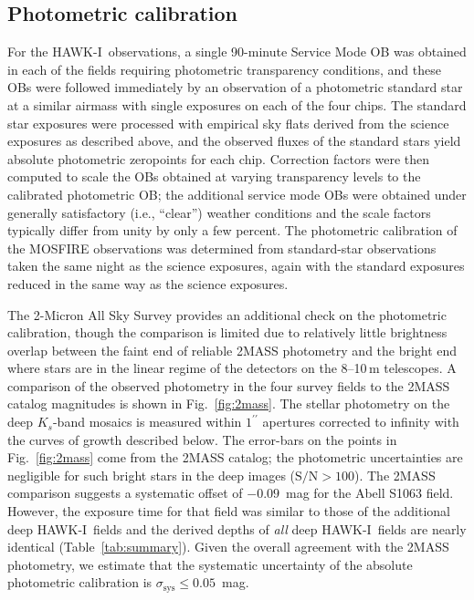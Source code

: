 \documentclass[preprint2]{aastex6}
\gdef\arcsec{^{\prime\prime}}
\gdef\HAWKI{\mbox{HAWK-I}}
\begin{document}
\subsection{Photometric calibration}
\label{s:calib}

For the \HAWKI\ observations, a single 90-minute Service Mode OB was obtained in each of the fields requiring photometric transparency conditions, and these OBs were followed immediately by an observation of a photometric standard star at a similar airmass with single exposures on each of the four chips.  The standard star exposures were processed with empirical sky flats derived from the science exposures as described above, and the observed fluxes of the standard stars yield absolute photometric zeropoints for each chip.  Correction factors were then computed to scale the OBs obtained at varying transparency levels to the calibrated photometric OB; the additional service mode OBs were obtained under generally satisfactory (i.e., ``clear'') weather conditions and the scale factors typically differ from unity by only a few percent.  The photometric calibration of the MOSFIRE observations was determined from standard-star observations taken the same night as the science exposures, again with the standard exposures reduced in the same way as the science exposures.

The 2-Micron All Sky Survey \citep[2MASS;][]{2mass} provides an additional check on the photometric calibration, though the comparison is limited due to relatively little brightness overlap between the faint end of reliable 2MASS photometry and the bright end where stars are in the linear regime of the detectors on the 8--10\,m telescopes.  A comparison of the observed photometry in the four survey fields to the 2MASS catalog magnitudes is shown in Fig.~\ref{fig:2mass}.  The stellar photometry on the deep $K_s$-band mosaics is measured within $1\arcsec$ apertures corrected to infinity with the curves of growth described below.  The error-bars on the points in Fig.~\ref{fig:2mass} come from the 2MASS catalog; the photometric uncertainties are negligible for such bright stars in the deep images ($\mathrm{S/N}>100$).  The 2MASS comparison suggests a systematic offset of $-0.09$~mag for the Abell S1063 field.  However, the exposure time for that field was similar to those of the additional deep \HAWKI\ fields and the derived depths of \textit{all} deep \HAWKI\ fields are nearly identical (Table~\ref{tab:summary}).  Given the overall agreement with the 2MASS photometry, we estimate that the systematic uncertainty of the absolute photometric calibration is $\sigma_\mathrm{sys}\leq0.05$~mag.  
\end{document}
